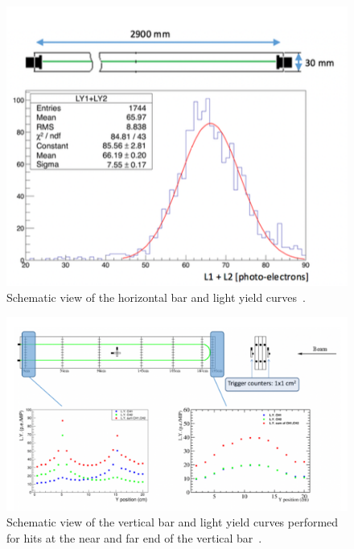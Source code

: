 \begin{figure}[h!]
\centering
\includegraphics[width=\textwidth]{figures/horizontal.png}
\caption{Schematic view of the horizontal bar and light yield curves~\cite{112Sascha1}.}
\label{fig:horizontal}
\end{figure}


\begin{figure}[h!]
\centering
\includegraphics[width=\textwidth]{figures/vertical.png}
\caption{Schematic view of the vertical bar and light yield curves performed for hits at the near and far end of the vertical bar~\cite{112Sascha1}.}
\label{fig:vertical}
\end{figure}



